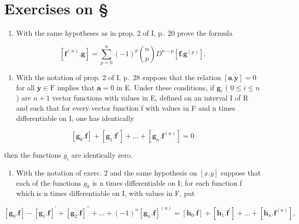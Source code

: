 \section*{Exercises on \S{}}
{}

\begin{enumerate}
\def\labelenumi{\arabic{enumi})}
\tightlist
\item
  With the same hypotheses as in prop. 2 of I, p.~20 prove the formula
\end{enumerate}

\[
[ \mathbf {f} ^ {(n)}. \mathbf {g} ] = \sum_ {p = 0} ^ {n} (- 1) ^ {p} \binom {n} {p} D ^ {n - p} [ \mathbf {f}. \mathbf {g} ^ {(p)} ].
\]

\begin{enumerate}
\def\labelenumi{\arabic{enumi})}
\setcounter{enumi}{1}
\tightlist
\item
  With the notation of prop. 2 of I, p.~28 suppose that the relation \([\mathbf{a}.\mathbf{y}] = 0\) for all \(\mathbf{y} \in \mathrm{F}\) implies that \(\mathbf{a} = 0\) in E. Under these conditions, if \(\mathbf{g}_i\) ( \(0 \leqslant i \leqslant n\) ) are \(n + 1\) vector functions with values in E, defined on an interval I of R and such that for every vector function f with values in F and n times differentiable on I, one has identically
\end{enumerate}

\[
[ \mathbf {g} _ {0}. \mathbf {f} ] + [ \mathbf {g} _ {1}. \mathbf {f} ^ {\prime} ] + \dots + [ \mathbf {g} _ {n}. \mathbf {f} ^ {(n)} ] = 0
\]

then the functions \(g_{i}\) are identically zero.

\begin{enumerate}
\def\labelenumi{\arabic{enumi})}
\setcounter{enumi}{2}
\tightlist
\item
  With the notation of exerc. 2 and the same hypothesis on \([x.y]\) suppose that each of the functions \(g_{k}\) is n times differentiable on I; for each function f which is n times differentiable on I, with values in F, put
\end{enumerate}

\[
[ \mathbf {g} _ {0}. \mathbf {f} ] - [ \mathbf {g} _ {1}. \mathbf {f} ] ^ {\prime} + [ \mathbf {g} _ {2}. \mathbf {f} ] ^ {\prime \prime} + \dots + (- 1) ^ {n} [ \mathbf {g} _ {n}. \mathbf {f} ] ^ {(n)} = [ \mathbf {h} _ {0}. \mathbf {f} ] + [ \mathbf {h} _ {1}. \mathbf {f} ^ {\prime} ] + \dots + [ \mathbf {h} _ {n}. \mathbf {f} ^ {(n)} ],
\]

